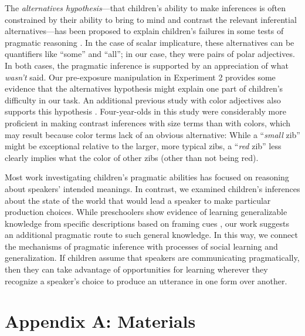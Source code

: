 \documentclass[man]{apa2}
\begin{document}
The \emph{alternatives hypothesis}---that children's ability to make inferences is often constrained by their ability to bring to mind and contrast the relevant inferential alternatives---has been proposed to explain children's failures in some tests of pragmatic reasoning \cite{chierchia2001,barner2011}. In the case of scalar implicature, these alternatives can be quantifiers like ``some'' and ``all''; in our case, they were pairs of polar adjectives. In both cases, the pragmatic inference is supported by an appreciation of what \emph{wasn't} said. Our pre-exposure manipulation in Experiment 2 provides some evidence that the alternatives hypothesis might explain one part of children's difficulty in our task. An additional previous study with color adjectives also supports this hypothesis \cite{horowitz2012}. Four-year-olds in this study were considerably more proficient in making contrast inferences with size terms than with colors, which may result because color terms lack of an obvious alternative: While a ``\emph{small} zib'' might be exceptional relative to the larger, more typical zibs, a ``\emph{red} zib'' less clearly implies what the color of other zibs (other than not being red). 

Most work investigating children's pragmatic abilities has focused on reasoning about speakers' intended meanings. In contrast, we examined children's inferences about the state of the world that would lead a speaker to make particular production choices. While preschoolers show evidence of learning generalizable knowledge from specific descriptions based on framing cues \cite{cimpian2009}, our work suggests an additional pragmatic route to such general knowledge. In this way, we connect the mechanisms of pragmatic inference with processes of social learning and generalization. If children assume that speakers are communicating pragmatically, then they can take advantage of opportunities for learning wherever they recognize a speaker's choice to produce an utterance in one form over another. 





\newpage
\theappendix 

\section{Appendix A: Materials}

\end{document}
